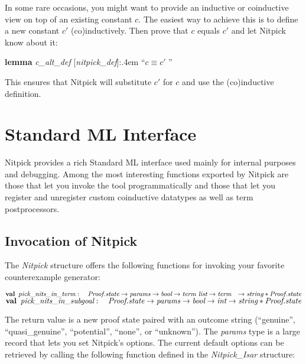 \documentclass[a4paper,12pt]{article}
\begin{document}
In some rare occasions, you might want to provide an inductive or coinductive
view on top of an existing constant $c$. The easiest way to achieve this is to
define a new constant $c'$ (co)inductively. Then prove that $c$ equals $c'$
and let Nitpick know about it:

\prew
\textbf{lemma} \textit{c\_alt\_def} [\textit{nitpick\_def}]:\kern.4em ``$c \equiv c'$\kern2pt ''
\postw

This ensures that Nitpick will substitute $c'$ for $c$ and use the (co)inductive
definition.

\section{Standard ML Interface}
\label{standard-ml-interface}

Nitpick provides a rich Standard ML interface used mainly for internal purposes
and debugging. Among the most interesting functions exported by Nitpick are
those that let you invoke the tool programmatically and those that let you
register and unregister custom coinductive datatypes as well as term
postprocessors.

\subsection{Invocation of Nitpick}
\label{invocation-of-nitpick}

The \textit{Nitpick} structure offers the following functions for invoking your
favorite counterexample generator:

\prew
$\textbf{val}\,~\textit{pick\_nits\_in\_term} : \\
\hbox{}\quad\textit{Proof.state} \rightarrow \textit{params} \rightarrow \textit{bool} \rightarrow \textit{term~list} \rightarrow \textit{term} \\
\hbox{}\quad{\rightarrow}\; \textit{string} * \textit{Proof.state}$ \\
$\textbf{val}\,~\textit{pick\_nits\_in\_subgoal} : \\
\hbox{}\quad\textit{Proof.state} \rightarrow \textit{params} \rightarrow \textit{bool} \rightarrow \textit{int} \rightarrow \textit{string} * \textit{Proof.state}$
\postw

The return value is a new proof state paired with an outcome string
(``genuine'', ``quasi\_genuine'', ``potential'', ``none'', or ``unknown''). The
\textit{params} type is a large record that lets you set Nitpick's options. The
current default options can be retrieved by calling the following function
defined in the \textit{Nitpick\_Isar} structure:
\end{document}
